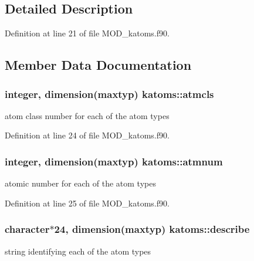 \subsection{Detailed Description}


Definition at line 21 of file M\-O\-D\-\_\-katoms.\-f90.



\subsection{Member Data Documentation}
\hypertarget{classkatoms_ac799e5c45595f48ed4b94d541937a348}{
\subsubsection[{atmcls}]{\setlength{\rightskip}{0pt plus 5cm}integer, dimension(maxtyp) katoms\-::atmcls}}\label{classkatoms_ac799e5c45595f48ed4b94d541937a348}


atom class number for each of the atom types 



Definition at line 24 of file M\-O\-D\-\_\-katoms.\-f90.

\hypertarget{classkatoms_a80cad356bd6a49794bf7cfe073c90741}{
\subsubsection[{atmnum}]{\setlength{\rightskip}{0pt plus 5cm}integer, dimension(maxtyp) katoms\-::atmnum}}\label{classkatoms_a80cad356bd6a49794bf7cfe073c90741}


atomic number for each of the atom types 



Definition at line 25 of file M\-O\-D\-\_\-katoms.\-f90.

\hypertarget{classkatoms_ab664f162eba949d1e187ddfc1af189a3}{
\subsubsection[{describe}]{\setlength{\rightskip}{0pt plus 5cm}character$\ast$24, dimension(maxtyp) katoms\-::describe}}\label{classkatoms_ab664f162eba949d1e187ddfc1af189a3}


string identifying each of the atom types 



